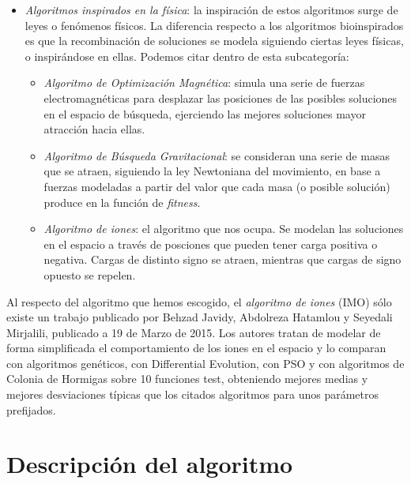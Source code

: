 \documentclass[a4paper,11pt]{article}
\begin{document}
\begin{itemize}
 \item \textit{Algoritmos inspirados en la física}: la inspiración de estos algoritmos surge de leyes o fenómenos físicos.
 La diferencia respecto a los algoritmos bioinspirados es que la recombinación de soluciones se modela siguiendo ciertas
 leyes físicas, o inspirándose en ellas. Podemos citar dentro de esta subcategoría:
 
  \begin{itemize}
    \item \textit{Algoritmo de Optimización Magnética}: simula una serie de fuerzas electromagnéticas para desplazar las posiciones
    de las posibles soluciones en el espacio de búsqueda, ejerciendo las mejores soluciones mayor atracción hacia ellas.
    
    \item \textit{Algoritmo de Búsqueda Gravitacional}: se consideran una serie de masas que se atraen, siguiendo la ley
    Newtoniana del movimiento, en base a fuerzas modeladas a partir del valor que cada masa (o posible solución) produce
    en la función de \textit{fitness}.
    
    \item \textit{Algoritmo de iones}: el algoritmo que nos ocupa. Se modelan las soluciones en el espacio a través de posciones
    que pueden tener carga positiva o negativa. Cargas de distinto signo se atraen, mientras que cargas de signo opuesto se repelen.
  \end{itemize}
\end{itemize}

Al respecto del algoritmo que hemos escogido, el \textit{algoritmo de iones} (IMO) sólo existe un trabajo publicado por Behzad Javidy, 
Abdolreza Hatamlou y Seyedali Mirjalili, publicado a 19 de Marzo de 2015. Los autores tratan de modelar de forma
simplificada el comportamiento de los iones en el espacio y lo comparan con algoritmos genéticos, con Differential Evolution,
con PSO y con algoritmos de Colonia de Hormigas sobre 10 funciones test, obteniendo mejores medias y mejores desviaciones
típicas que los citados algoritmos para unos parámetros prefijados.

\section{Descripción del algoritmo}
\end{document}
